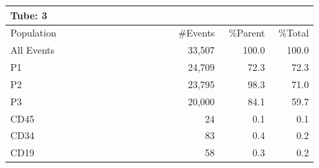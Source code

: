 \documentclass[UTF8,10pt,a4paper,fontset=fandol]{ctexart}
\newcommand{\fieldvalue}[1]{#1}
\begin{document}
\begin{center}
\small
\begin{tabular}{@{}p{0.17\linewidth}p{0.35\linewidth}r r r@{}}
\multicolumn{5}{l}{Tube:\quad
\fieldvalue{3}}\\
\hline
Population & & \#Events & \%Parent & \%Total\\
\hline
All Events & &
\fieldvalue{33,507} &
\fieldvalue{100.0} &
\fieldvalue{100.0}
\\
P1 & &
\fieldvalue{24,709} &
\fieldvalue{72.3} &
\fieldvalue{72.3}
\\
P2 & &
\fieldvalue{23,795} &
\fieldvalue{98.3} &
\fieldvalue{71.0}
\\
P3 & &
\fieldvalue{20,000} &
\fieldvalue{84.1} &
\fieldvalue{59.7}
\\
CD45 & &
\fieldvalue{24} &
\fieldvalue{0.1} &
\fieldvalue{0.1}
\\
CD34 & &
\fieldvalue{83} &
\fieldvalue{0.4} &
\fieldvalue{0.2}
\\
CD19 & &
\fieldvalue{58} &
\fieldvalue{0.3} &
\fieldvalue{0.2}
\\
\hline
\end{tabular}
\end{center}
\end{document}
